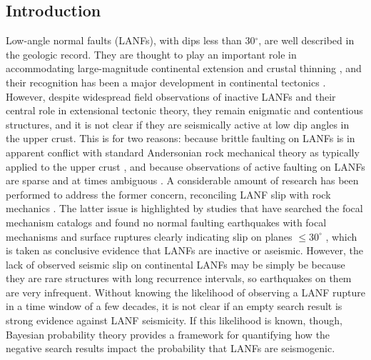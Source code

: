\documentclass[twocolumn,grl]{AGUTeX}
\begin{document}
\begin{article}

\section{Introduction}
Low-angle normal faults (LANFs), with dips less than 30$^\circ$, are well
described in the geologic record. They are thought to play an important role in
accommodating large-magnitude continental extension \citep{howard1987crustal}
and crustal thinning \citep{lister1986detachment}, and their recognition has
been a major development in continental tectonics
\citep{wernicke2009detachment}. However, despite widespread field observations
of inactive LANFs and their central role in extensional tectonic theory, they
remain enigmatic and contentious structures, and it is not clear if they are
seismically active at low dip angles in the upper crust. This is for two
reasons: because brittle faulting on LANFs is in apparent conflict with
standard Andersonian rock mechanical theory as typically applied to the upper
crust \citep{axen2004lanfmech}, and because observations of active faulting on
LANFs are sparse and at times ambiguous \citep{wernicke1995seis}.
A considerable amount of research has been performed to address the former
concern, reconciling LANF slip with rock mechanics \citep [e.g.,]
[]{axenbartley1997, collettini2011lanfmech}.  The latter issue is highlighted
by studies that have searched the focal mechanism catalogs and found no normal
faulting earthquakes with focal mechanisms and surface ruptures clearly
indicating slip on planes $\le30^\circ$ \citep{jackson1987,
collettinisibson2001}, which is taken as conclusive evidence that LANFs are
inactive or aseismic.  However, the lack of observed seismic slip on
continental LANFs may be simply be because they are rare structures with long
recurrence intervals, so earthquakes on them are very infrequent. Without
knowing the likelihood of observing a LANF rupture in a time window of a few
decades, it is not clear if an empty search result is strong evidence against
LANF seismicity. If this likelihood is known, though, Bayesian probability
theory provides a framework for quantifying how the negative search results
impact the probability that LANFs are seismogenic.


\end{article}
\end{document}
